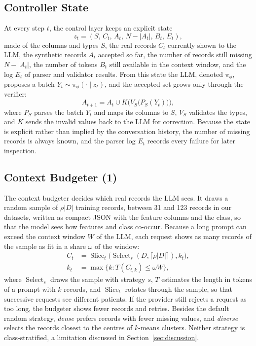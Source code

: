 \documentclass[conference]{IEEEtran}
\begin{document}
\subsection{Controller State}
At every step $t$, the control layer keeps an explicit state
\begin{equation}
z_t=(S,\,C_t,\,A_t,\,N-|A_t|,\,B_t,\,E_t),
\label{eq:state}
\end{equation}
made of the columns and types $S$, the real records $C_t$ currently shown to the LLM, the synthetic records $A_t$ accepted so far, the number of records still missing $N-|A_t|$, the number of tokens $B_t$ still available in the context window, and the log $E_t$ of parser and validator results. From this state the LLM, denoted $\pi_{\phi}$, proposes a batch $Y_t\sim\pi_{\phi}(\cdot\mid z_t)$, and the accepted set grows only through the verifier:
\begin{equation}
A_{t+1}=A_t\cup K\bigl(V_S\bigl(P_S(Y_t)\bigr)\bigr),
\label{eq:acceptance}
\end{equation}
where $P_S$ parses the batch $Y_t$ and maps its columns to $S$, $V_S$ validates the types, and $K$ sends the invalid values back to the LLM for correction. Because the state is explicit rather than implied by the conversation history, the number of missing records is always known, and the parser log $E_t$ records every failure for later inspection.

\subsection{Context Budgeter (1)}
The context budgeter decides which real records the LLM sees. It draws a random sample of $\rho|D|$ training records, between 31 and 123 records in our datasets, written as compact JSON with the feature columns and the class, so that the model sees how features and class co-occur. Because a long prompt can exceed the context window $W$ of the LLM, each request shows as many records of the sample as fit in a share $\omega$ of the window:
\begin{equation}
\begin{aligned}
C_t&=\operatorname{Slice}_{t}\bigl(\operatorname{Select}_{s}(D,\lceil\rho|D|\rceil),k_t\bigr),\\
k_t&=\max\{k:T(C_{t,k})\leq\omega W\},
\end{aligned}
\label{eq:context}
\end{equation}
where $\operatorname{Select}_s$ draws the sample with strategy $s$, $T$ estimates the length in tokens of a prompt with $k$ records, and $\operatorname{Slice}_t$ rotates through the sample, so that successive requests see different patients. If the provider still rejects a request as too long, the budgeter shows fewer records and retries. Besides the default random strategy, \emph{dense} prefers records with fewer missing values, and \emph{diverse} selects the records closest to the centres of $k$-means clusters. Neither strategy is class-stratified, a limitation discussed in Section~\ref{sec:discussion}.
\end{document}
